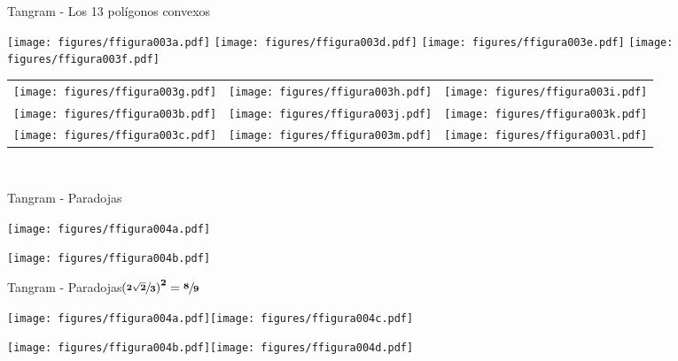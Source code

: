 \documentclass[14pt,aspectratio=169,usenames,dvipsnames]{beamer}
\begin{document}

    \begin{frame}{Tangram - Los 13 polígonos convexos}
        \begin{center}
            \texttt{[image: figures/ffigura003a.pdf]}\qquad
            \texttt{[image: figures/ffigura003d.pdf]}\qquad
            \texttt{[image: figures/ffigura003e.pdf]}\qquad
            \texttt{[image: figures/ffigura003f.pdf]}\\ \bigskip
            \begin{tabular}{ccc}
                \texttt{[image: figures/ffigura003g.pdf]} &
                \texttt{[image: figures/ffigura003h.pdf]} &
                \texttt{[image: figures/ffigura003i.pdf]} \\[1ex]
                \texttt{[image: figures/ffigura003b.pdf]} &
                \texttt{[image: figures/ffigura003j.pdf]} &
                \texttt{[image: figures/ffigura003k.pdf]} \\[1ex]
                \texttt{[image: figures/ffigura003c.pdf]} &
                \texttt{[image: figures/ffigura003m.pdf]} &
                \texttt{[image: figures/ffigura003l.pdf]} \\[1ex]
            \end{tabular}\\
        \end{center}
    \end{frame}


    \begin{frame}{Tangram - Paradojas}
        \begin{center}
            \texttt{[image: figures/ffigura004a.pdf]}\;\;\qquad\; \\

            \vspace{3em}

            \texttt{[image: figures/ffigura004b.pdf]}\qquad{} \\
        \end{center}
    \end{frame}


    \begin{frame}{Tangram - Paradojas\qquad $\mathbf{\left(\sfrac{2\sqrt{2}}{3}\right)^2 = \sfrac{8}{9}}$}
        \begin{center}
            \texttt{[image: figures/ffigura004a.pdf]}\;\;\qquad\;\texttt{[image: figures/ffigura004c.pdf]} \\

            \vspace{3em}

            \texttt{[image: figures/ffigura004b.pdf]}\qquad\texttt{[image: figures/ffigura004d.pdf]} \\
        \end{center}
    \end{frame}
\end{document}
